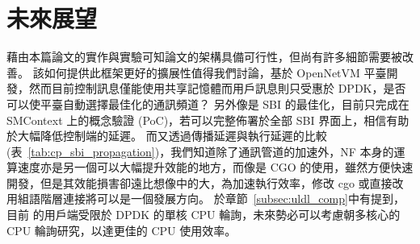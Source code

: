 \chapter{未來展望}
\label{chapter:future}


藉由本篇論文的實作與實驗可知論文的架構具備可行性，但尚有許多細節需要被改善。
該如何提供此框架更好的擴展性值得我們討論，\LHCN 基於 OpenNetVM 平臺開發，然而目前控制訊息僅能使用共享記憶體而用戶訊息則只受惠於 DPDK，是否可以使平臺自動選擇最佳化的通訊頻道？
另外像是 SBI 的最佳化，目前只完成在 SMContext 上的概念驗證 (PoC)，若可以完整佈署於全部 SBI 界面上，相信有助於大幅降低控制端的延遲。
而又透過傳播延遲與執行延遲的比較 (表~\ref{tab:cp_sbi_propagation})，我們知道除了通訊管道的加速外，NF 本身的運算速度亦是另一個可以大幅提升效能的地方，而像是 CGO 的使用，雖然方便快速開發，但是其效能損害卻遠比想像中的大\cite{cgo_not_go}，為加速執行效率，修改 cgo 或直接改用組語階層連接將可以是一個發展方向。
於章節~\ref{subsec:uldl_comp}中有提到，目前 \LHCN 的用戶端受限於 DPDK 的單核 CPU 輪詢，未來勢必可以考慮朝多核心的 CPU 輪詢研究，以達更佳的 CPU 使用效率。
